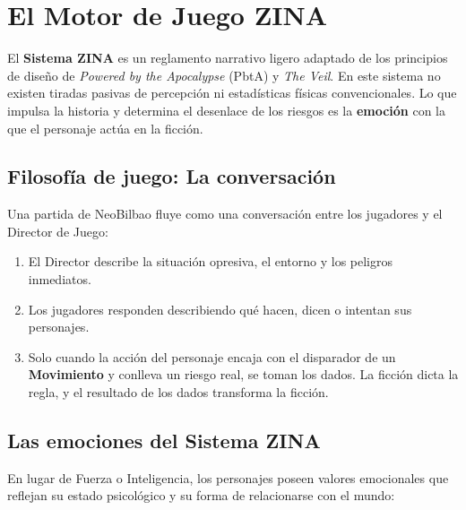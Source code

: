 \chapter{El Motor de Juego ZINA}

El \textbf{Sistema ZINA} es un reglamento narrativo ligero adaptado de los principios de diseño de \emph{Powered by the Apocalypse} (PbtA) y \emph{The Veil}. En este sistema no existen tiradas pasivas de percepción ni estadísticas físicas convencionales. Lo que impulsa la historia y determina el desenlace de los riesgos es la \textbf{emoción} con la que el personaje actúa en la ficción.

\section{Filosofía de juego: La conversación}

Una partida de NeoBilbao fluye como una conversación entre los jugadores y el Director de Juego:
\begin{enumerate}
  \item El Director describe la situación opresiva, el entorno y los peligros inmediatos.
  \item Los jugadores responden describiendo qué hacen, dicen o intentan sus personajes.
  \item Solo cuando la acción del personaje encaja con el disparador de un \textbf{Movimiento} y conlleva un riesgo real, se toman los dados. La ficción dicta la regla, y el resultado de los dados transforma la ficción.
\end{enumerate}

\section{Las emociones del Sistema ZINA}

En lugar de Fuerza o Inteligencia, los personajes poseen valores emocionales que reflejan su estado psicológico y su forma de relacionarse con el mundo:

